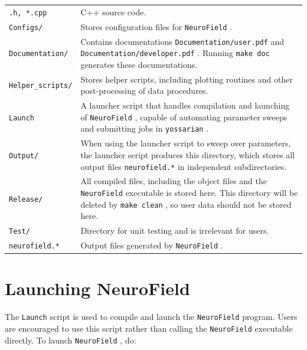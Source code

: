 \documentclass[12pt,a4paper]{article}
\newcommand{\type}[1]{ {\small\small\tt #1} }
\newcommand{\NF}[0]{ \type{NeuroField}}
\begin{document}
\begin{tabular}{l p{14.4cm}}
\type{*.h, *.cpp}& C++ source code.\\
\type{Configs/}& Stores configuration files for \NF.\\
\type{Documentation/}& Contains documentations \type{Documentation/user.pdf} and \type{Documentation/developer.pdf}. Running \type{make doc} generates these documentations.\\
\type{Helper\_scripts/}& Stores helper scripts, including plotting routines and other post-processing of data procedures.\\
\type{Launch}& A launcher script that handles compilation and launching of \NF, capable of automating parameter sweeps and submitting jobs in \type{yossarian}.\\
\type{Output/}& When using the launcher script to sweep over parameters, the launcher script produces this directory, which stores all output files \type{neurofield.*} in independent subdirectories.\\
\type{Release/}& All compiled files, including the object files and the \NF executable is stored here. This directory will be deleted by \type{make clean}, so user data should not be stored here.\\
\type{Test/}& Directory for unit testing and is irrelevant for users.\\
\type{neurofield.*}& Output files generated by \NF.
\end{tabular}

\section{Launching NeuroField}
\label{sec:launch}

The \type{Launch} script is used to compile and launch the \NF program. Users are encouraged to use this script rather than calling the \NF executable directly. To launch \NF, do:
\end{document}
